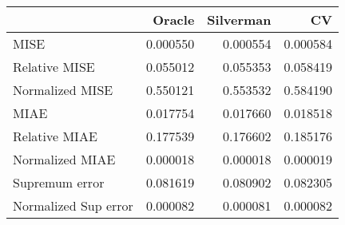 \begin{tabular}{lrrr}
  \toprule
 & Oracle & Silverman & CV \\ 
  \midrule
MISE & 0.000550 & 0.000554 & 0.000584 \\ 
  Relative MISE & 0.055012 & 0.055353 & 0.058419 \\ 
  Normalized MISE & 0.550121 & 0.553532 & 0.584190 \\ 
  MIAE & 0.017754 & 0.017660 & 0.018518 \\ 
  Relative MIAE & 0.177539 & 0.176602 & 0.185176 \\ 
  Normalized MIAE & 0.000018 & 0.000018 & 0.000019 \\ 
  Supremum error & 0.081619 & 0.080902 & 0.082305 \\ 
  Normalized Sup error & 0.000082 & 0.000081 & 0.000082 \\ 
   \bottomrule
\end{tabular}
